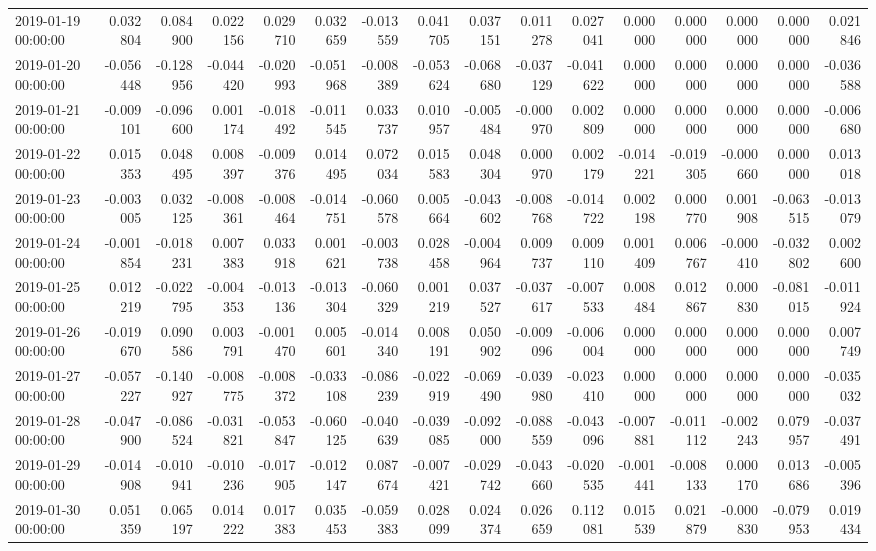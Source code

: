 \begin{tabular}{lrrrrrrrrrrrrrrr}
2019-01-19 00:00:00 & 0.032804 & 0.084900 & 0.022156 & 0.029710 & 0.032659 & -0.013559 & 0.041705 & 0.037151 & 0.011278 & 0.027041 & 0.000000 & 0.000000 & 0.000000 & 0.000000 & 0.021846 \\
2019-01-20 00:00:00 & -0.056448 & -0.128956 & -0.044420 & -0.020993 & -0.051968 & -0.008389 & -0.053624 & -0.068680 & -0.037129 & -0.041622 & 0.000000 & 0.000000 & 0.000000 & 0.000000 & -0.036588 \\
2019-01-21 00:00:00 & -0.009101 & -0.096600 & 0.001174 & -0.018492 & -0.011545 & 0.033737 & 0.010957 & -0.005484 & -0.000970 & 0.002809 & 0.000000 & 0.000000 & 0.000000 & 0.000000 & -0.006680 \\
2019-01-22 00:00:00 & 0.015353 & 0.048495 & 0.008397 & -0.009376 & 0.014495 & 0.072034 & 0.015583 & 0.048304 & 0.000970 & 0.002179 & -0.014221 & -0.019305 & -0.000660 & 0.000000 & 0.013018 \\
2019-01-23 00:00:00 & -0.003005 & 0.032125 & -0.008361 & -0.008464 & -0.014751 & -0.060578 & 0.005664 & -0.043602 & -0.008768 & -0.014722 & 0.002198 & 0.000770 & 0.001908 & -0.063515 & -0.013079 \\
2019-01-24 00:00:00 & -0.001854 & -0.018231 & 0.007383 & 0.033918 & 0.001621 & -0.003738 & 0.028458 & -0.004964 & 0.009737 & 0.009110 & 0.001409 & 0.006767 & -0.000410 & -0.032802 & 0.002600 \\
2019-01-25 00:00:00 & 0.012219 & -0.022795 & -0.004353 & -0.013136 & -0.013304 & -0.060329 & 0.001219 & 0.037527 & -0.037617 & -0.007533 & 0.008484 & 0.012867 & 0.000830 & -0.081015 & -0.011924 \\
2019-01-26 00:00:00 & -0.019670 & 0.090586 & 0.003791 & -0.001470 & 0.005601 & -0.014340 & 0.008191 & 0.050902 & -0.009096 & -0.006004 & 0.000000 & 0.000000 & 0.000000 & 0.000000 & 0.007749 \\
2019-01-27 00:00:00 & -0.057227 & -0.140927 & -0.008775 & -0.008372 & -0.033108 & -0.086239 & -0.022919 & -0.069490 & -0.039980 & -0.023410 & 0.000000 & 0.000000 & 0.000000 & 0.000000 & -0.035032 \\
2019-01-28 00:00:00 & -0.047900 & -0.086524 & -0.031821 & -0.053847 & -0.060125 & -0.040639 & -0.039085 & -0.092000 & -0.088559 & -0.043096 & -0.007881 & -0.011112 & -0.002243 & 0.079957 & -0.037491 \\
2019-01-29 00:00:00 & -0.014908 & -0.010941 & -0.010236 & -0.017905 & -0.012147 & 0.087674 & -0.007421 & -0.029742 & -0.043660 & -0.020535 & -0.001441 & -0.008133 & 0.000170 & 0.013686 & -0.005396 \\
2019-01-30 00:00:00 & 0.051359 & 0.065197 & 0.014222 & 0.017383 & 0.035453 & -0.059383 & 0.028099 & 0.024374 & 0.026659 & 0.112081 & 0.015539 & 0.021879 & -0.000830 & -0.079953 & 0.019434 \\

\end{tabular}
